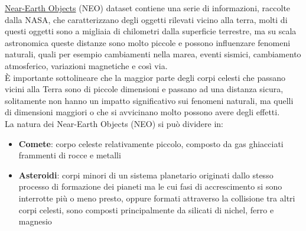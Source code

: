 \documentclass[italian,12pt,a4paper]{article}
\begin{document}
	\href{https://www.kaggle.com/datasets/sameepvani/nasa-nearest-earth-objects/}{Near-Earth Objects} (NEO) dataset contiene una serie di informazioni, raccolte dalla NASA, che caratterizzano degli oggetti rilevati vicino alla terra, molti di questi oggetti sono a migliaia di chilometri dalla superficie terrestre, ma su scala astronomica queste distanze sono molto piccole e possono influenzare fenomeni naturali, quali per esempio cambiamenti nella marea, eventi sismici, cambiamento atmosferico, variazioni magnetiche e così via. \\
	È importante sottolineare che la maggior parte degli corpi celesti che passano vicini alla Terra sono di piccole dimensioni e passano ad una distanza sicura, solitamente non hanno un impatto significativo sui fenomeni naturali, ma quelli di dimensioni maggiori o che si avvicinano molto possono avere degli effetti. \\
	\linebreak
	La natura dei Near-Earth Objects (NEO) si può dividere in:
	\begin{itemize}
		\item \textbf{Comete}: corpo celeste relativamente piccolo, composto da gas ghiacciati frammenti di rocce e metalli
		\item \textbf{Asteroidi}: corpi minori di un sistema planetario originati dallo stesso processo di formazione dei pianeti ma le cui fasi di accrescimento si sono interrotte più o meno presto, oppure formati attraverso la collisione tra altri corpi celesti, sono composti principalmente da silicati di nichel, ferro e magnesio
	\end{itemize}

	
\end{document}
